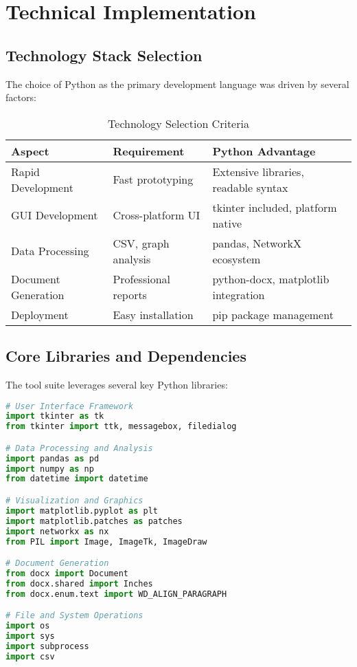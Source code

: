 \documentclass[binding=0.6cm]{sapthesis}
\begin{document}
\section{Technical Implementation}

\subsection{Technology Stack Selection}

The choice of Python as the primary development language was driven by several factors:

\begin{table}[H]
\centering
\caption{Technology Selection Criteria}
\begin{tabular}{|l|l|l|}
\hline
\textbf{Aspect} & \textbf{Requirement} & \textbf{Python Advantage} \\ \hline
Rapid Development & Fast prototyping & Extensive libraries, readable syntax \\ \hline
GUI Development & Cross-platform UI & tkinter included, platform native \\ \hline
Data Processing & CSV, graph analysis & pandas, NetworkX ecosystem \\ \hline
Document Generation & Professional reports & python-docx, matplotlib integration \\ \hline
Deployment & Easy installation & pip package management \\ \hline
\end{tabular}
\end{table}

\subsection{Core Libraries and Dependencies}

The tool suite leverages several key Python libraries:

\begin{lstlisting}[language=Python, caption=Core Dependencies Structure]
# User Interface Framework
import tkinter as tk
from tkinter import ttk, messagebox, filedialog

# Data Processing and Analysis
import pandas as pd
import numpy as np
from datetime import datetime

# Visualization and Graphics
import matplotlib.pyplot as plt
import matplotlib.patches as patches
import networkx as nx
from PIL import Image, ImageTk, ImageDraw

# Document Generation
from docx import Document
from docx.shared import Inches
from docx.enum.text import WD_ALIGN_PARAGRAPH

# File and System Operations
import os
import sys
import subprocess
import csv
\end{lstlisting}
\end{document}
